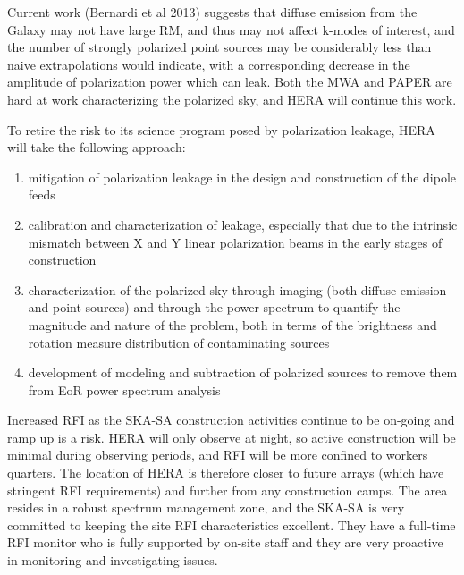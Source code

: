\documentclass[preprint]{aastex}
\begin{document}
% 
Current work (Bernardi et al 2013) suggests that diffuse emission from the Galaxy may not have large RM, and thus may not affect k-modes of interest, and the number of strongly polarized point sources may be considerably less than naive extrapolations would indicate, with a corresponding  decrease in the amplitude of polarization power which can leak.  Both the MWA and PAPER are hard at work characterizing the polarized sky, and HERA will continue this work.  

To retire the risk to its science program posed by polarization leakage, HERA will take the following approach:
\begin{enumerate}
\item mitigation of polarization leakage in the design and construction of the dipole feeds
\item calibration and characterization of leakage, especially that due to the intrinsic mismatch between X and Y linear polarization beams in the early stages of construction
\item characterization of the polarized sky through imaging (both diffuse emission and point sources) and through the power spectrum to quantify the magnitude and nature of the problem, both in terms of the brightness and rotation measure distribution of contaminating sources
\item development of modeling and subtraction of polarized sources to remove them from EoR power spectrum analysis
\end{enumerate}

Increased RFI as the SKA-SA construction activities continue to be on-going and 
ramp up is a risk.  HERA will only observe at night, so active construction will be
minimal during observing periods, and RFI will be more confined to workers quarters.
The location of HERA is therefore closer to future arrays (which have stringent
RFI requirements) and further from any construction camps.  The area resides in
a robust spectrum management zone, and the SKA-SA is very committed to
keeping the site RFI characteristics excellent.  They have a full-time RFI monitor
who is fully supported by on-site staff and they are very proactive in monitoring
and investigating issues.
\end{document}
